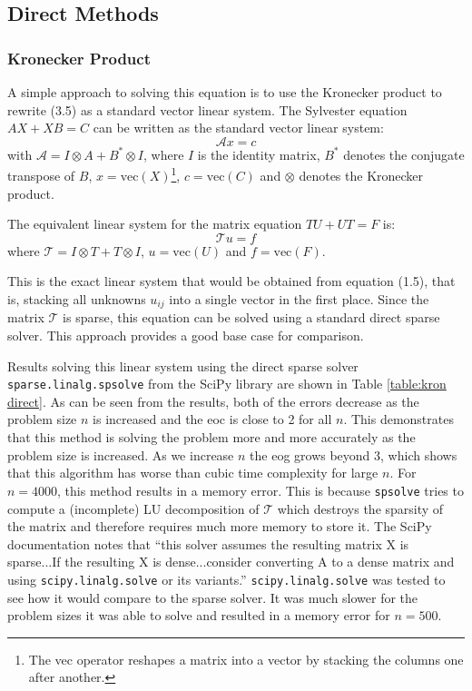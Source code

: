 \documentclass[11pt]{article}
\numberwithin{equation}{section}
\begin{document}
\subsection{Direct Methods}

\subsubsection{Kronecker Product}
A simple approach to solving this equation is to use the Kronecker product to rewrite (3.5) as a standard vector linear system. The Sylvester equation $AX + XB = C$ can be written as the standard vector linear system:
\begin{equation}
\mathcal{A}x = c
\end{equation}
with $\mathcal{A} = I \otimes A + B^* \otimes I$, where $I$ is the identity matrix, $B^*$ denotes the conjugate transpose of $B$, $x = \text{vec}(X)$\footnote{The vec operator reshapes a matrix into a vector by stacking the columns one after another.}, $c = \text{vec}(C)$ and $\otimes$ denotes the Kronecker product.

The equivalent linear system for the matrix equation $TU + UT = F$ is:
\begin{equation}
\mathcal{T}u = f
\end{equation}
where $\mathcal{T} = I \otimes T + T \otimes I$, $u = \text{vec}(U)$ and $f = \text{vec}(F)$.

This is the exact linear system that would be obtained from equation (1.5), that is, stacking all unknowns $u_{ij}$ into a single vector in the first place. Since the matrix $\mathcal{T}$ is sparse, this equation can be solved using a standard direct sparse solver. This approach provides a good base case for comparison. 

Results solving this linear system using the direct sparse solver \texttt{sparse.linalg.spsolve} from the SciPy library are shown in Table \ref{table:kron direct}. As can be seen from the results, both of the errors decrease as the problem size $n$ is increased and the eoc is close to 2 for all $n$. This demonstrates that this method is solving the problem more and more accurately as the problem size is increased. As we increase $n$ the eog grows beyond $3$, which shows that this algorithm has worse than cubic time complexity for large $n$. For $n=4000$, this method results in a memory error. This is because \texttt{spsolve} tries to compute a (incomplete) LU decomposition of $\mathcal{T}$ which destroys the sparsity of the matrix and therefore requires much more memory to store it. The SciPy documentation notes that ``this solver assumes the resulting matrix X is sparse...If the resulting X is dense...consider converting A to a dense matrix and using \texttt{scipy.linalg.solve} or its variants.'' \texttt{scipy.linalg.solve} was tested to see how it would compare to the sparse solver. It was much slower for the problem sizes it was able to solve and resulted in a memory error for $n=500$.
\end{document}
